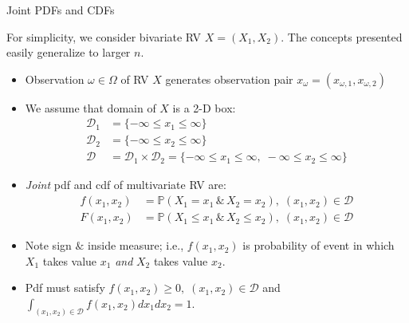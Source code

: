 \documentclass[9pt]{beamer}
\begin{document}
%
\begin{frame}{Joint PDFs and CDFs}

For simplicity, we consider bivariate RV $X=(X_1,X_2)$. The concepts presented easily generalize to larger $n$.

\begin{itemize}
\setlength{\itemsep}{10pt}
\item Observation $\omega \in \Omega$ of RV $X$ generates observation pair $x_\omega=(x_{\omega,1},x_{\omega,2})$ 

\item We assume that domain of $X$ is a 2-D box: 
\begin{align*}
\mathcal{D}_1&=\{-\infty \leq x_1\leq \infty\}\\
\mathcal{D}_2&=\{-\infty \leq x_2\leq \infty\}\\
\mathcal{D}&=\mathcal{D}_1\times \mathcal{D}_2=\{-\infty \leq x_1\leq \infty,\;  -\infty \leq x_2\leq \infty\}
\end{align*}

\item {\em Joint} pdf and cdf of multivariate RV are:
\begin{align*}
f(x_1,x_2)&=\mathbb{P}(X_1=x_1\,\&\, X_2=x_2),\; (x_1,x_2)\in\mathcal{D}\\
F(x_1,x_2)&=\mathbb{P}(X_1\leq x_1\,\&\, X_2\leq x_2),\; (x_1,x_2)\in\mathcal{D}
\end{align*}
\item Note sign $\&$ inside measure; i.e., $f(x_1,x_2)$ is probability of event in which $X_1$ takes value  $x_1$ {\em and} $X_2$ takes value $x_2$.  

\item Pdf must satisfy $f(x_1,x_2)\geq 0,\; (x_1,x_2)\in \mathcal{D}$ and $\int_{(x_1,x_2)\in \mathcal{D}}f(x_1,x_2)dx_1dx_2=1$.

\end{itemize}


\end{frame}
\end{document}
